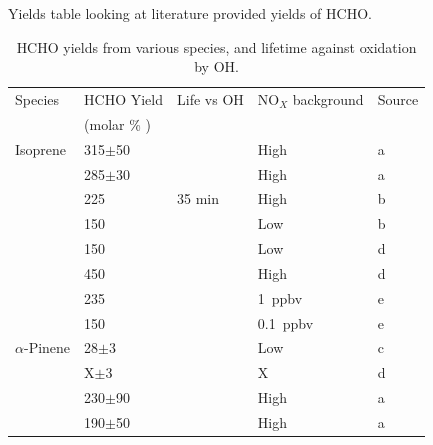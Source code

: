     
    Yields table looking at literature provided yields of HCHO.
    
    \begin{table} \begin{threeparttable}
      \caption{ HCHO yields from various species, and lifetime against oxidation by OH. }
      \begin{tabular}{  l  l  l  l  l  }
        \toprule
        Species    & HCHO Yield    & Life vs OH   & NO$_X$ background & Source   \\
                   & (molar \% )   &              &                   &          \\
        \midrule 
        Isoprene	& 315$\pm$50      &            & High          & a        \\ 
                  & 285$\pm$30      &            & High          & a        \\ 
                  & 225             & 35 min     & High          & b        \\ %
                  & 150             &            & Low           & b        \\ %
                  & 150             &            & Low           & d        \\
                  & 450             &            & High          & d        \\
                  & 235             &            & 1~ppbv        & e        \\
                  & 150             &            & 0.1~ppbv      & e        \\
        $\alpha$-Pinene & 28$\pm$3        &        & Low                & c        \\ 
                        & X$\pm$3         &        & X                  & d        \\ 
                        & 230$\pm$90      &        & High        & a        \\ 
                        & 190$\pm$50      &        & High        & a        \\ 

\end{tabular}
\end{threeparttable}
\end{table}
